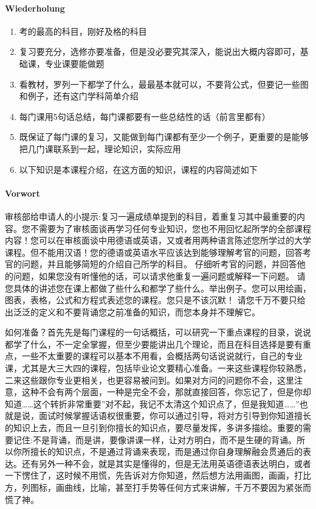 \documentclass[b5paper, twoside]{ctexbook}
\begin{document}
\paragraph{Wiederholung}
\begin{enumerate}
  \item 考的最高的科目，刚好及格的科目
  \item 复习要充分，选修亦要准备，但是没必要究其深入，能说出大概内容即可，基础课，专业课要能做题
  \item 看教材，罗列一下都学了什么，最最基本就可以，不要背公式，但要记一些图和例子，还有这门学科简单介绍
  \item 每门课用5句话总结，每门课都要有一些总结性的话（前言里都有）
  \item 既保证了每门课的复习，又能做到每门课都有至少一个例子，更重要的是能够把几门课联系到一起，理论知识，实际应用
  \item 以下知识是本课程介绍，在这方面的知识，课程的内容简述如下
\end{enumerate}

\paragraph{Vorwort}
审核部给申请人的小提示:复习一遍成绩单提到的科目，着重复习其中最重要的内容。您不需要为了审核面谈再学习任何专业知识，您也不用回忆起所学的全部课程内容！您可以在审核面谈中用德语或英语，又或者用两种语言陈述您所学过的大学课程。但不能用汉语！您的德语或英语水平应该达到能够理解考官的问题，回答考官的问题，并且能够简短的介绍自己所学的科目。 仔细听考官的问题，并回答他的问题，如果您没有听懂他的话，可以请求他重复一遍问题或解释一下问题。 请您具体的讲述您在课上都做了些什么和都学了些什么。举出例子。您可以用绘画，图表，表格，公式和方程式表述您的课程。您只是不该沉默！ 请您千万不要只给出泛泛的定义和不要背诵您之前准备的知识，而您本身并不理解它。

如何准备？首先先是每门课程的一句话概括，可以研究一下重点课程的目录，说说都学了什么，不一定全掌握，但至少要能讲出几个理论，而且在科目选择是要有重点，一些不太重要的课程可以基本不用看，会概括两句话说说就行，自己的专业课，尤其是大三大四的课程，包括毕业论文要精心准备。一来这些课程你较熟悉，二来这些跟你专业更相关，也更容易被问到。如果对方问的问题你不会，这里注意，这种不会有两个层面，一种是完全不会，那就直接回答，你忘记了，但是你却知道……这个转折非常重要”对不起，我记不太清这个知识点了，但是我知道……”也就是说，面试时候掌握话语权很重要，你可以通过引导，将对方引导到你知道擅长的知识上去，而且一旦引到你擅长的知识点，要尽量发挥，多讲多描绘。重要的需要记住:不是背诵，而是讲，要像讲课一样，让对方明白，而不是生硬的背诵。所以你所擅长的知识点，不是通过背诵来表现，而是通过你自身理解融会贯通后的表达。还有另外一种不会，就是其实是懂得的，但是无法用英语德语表达明白，或者一下愣住了，这时候不用慌，先告诉对方你知道，然后想方法用画图，画画，打比方，列图标，画曲线，比喻，甚至打手势等任何方式来讲解，千万不要因为紧张而慌了神。









\end{document}
